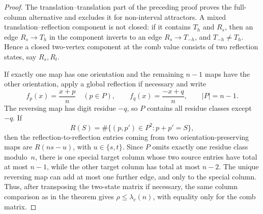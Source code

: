 \documentclass{amsart}
\theoremstyle{definition}
\theoremstyle{remark}
\begin{document}
\begin{proof}
The translation--translation part of the preceding proof proves the
full-column alternative and excludes it for non-interval attractors.  A
mixed translation--reflection component is not closed: if it contains
\(T_h\) and \(R_s\), then an edge \(R_s\to T_h\) in the component
inverts to an edge \(R_s\to T_{-h}\), and \(T_{-h}\ne T_h\).  Hence a
closed two-vertex component at the comb value consists of two reflection
states, say \(R_s,R_t\).

If exactly one map has one orientation and the remaining \(n-1\) maps
have the other orientation, apply a global reflection if necessary and
write
\[
  f_p(x)=\frac{x+p}{n}\quad (p\in P),
  \qquad
  f_q(x)=\frac{-x+q}{n},
  \qquad |P|=n-1.
\]
The reversing map has digit residue \(-q\), so \(P\) contains all
residue classes except \(-q\).  If
\[
  R(S)=\#\{(p,p')\in P^2:p+p'=S\},
\]
then the reflection-to-reflection entries coming from two
orientation-preserving maps are \(R(ns-u)\), with \(u\in\{s,t\}\).  Since
\(P\) omits exactly one residue class modulo~\(n\), there is one special
target column whose two source entries have total at most \(n-1\), while
the other target column has total at most \(n-2\).  The unique reversing
map can add at most one further edge, and only to the special column.
Thus, after transposing the two-state matrix if necessary, the same
column comparison as in the theorem gives \(\rho\le\lambda_c(n)\), with
equality only for the comb matrix.


\end{proof}
\end{document}
